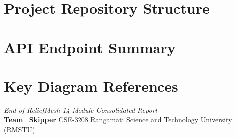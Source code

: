\documentclass[11pt,a4paper]{report}
\begin{document}


\appendix
\chapter{Project Repository Structure}
\label{app:a}


\chapter{API Endpoint Summary}
\label{app:b}


\chapter{Key Diagram References}
\label{app:c}


\clearpage
\thispagestyle{plain}
\begin{center}
\vspace*{\fill}
\textit{End of ReliefMesh 14-Module Consolidated Report}\\[4pt]
\textbf{Team\_Skipper} \textbar{} CSE-3208 \textbar{} Rangamati Science and Technology University (RMSTU)
\vspace*{\fill}
\end{center}
\end{document}

